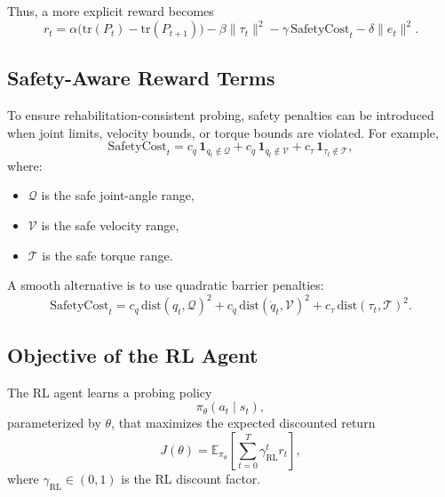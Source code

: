 \documentclass[11pt]{article}
\begin{document}
Thus, a more explicit reward becomes
\begin{equation}
r_t =
\alpha \bigl(\mathrm{tr}(P_t)-\mathrm{tr}(P_{t+1})\bigr)
-\beta \|\tau_t\|^2
-\gamma\,\mathrm{SafetyCost}_t
-\delta \|e_t\|^2.
\label{eq:rl_reward_trace}
\end{equation}

\subsection{Safety-Aware Reward Terms}

To ensure rehabilitation-consistent probing, safety penalties can be introduced when joint limits, velocity bounds, or torque bounds are violated. For example,
\begin{equation}
\mathrm{SafetyCost}_t =
c_q \,\mathbf{1}_{q_t \notin \mathcal{Q}}
+ c_{\dot{q}} \,\mathbf{1}_{\dot{q}_t \notin \mathcal{V}}
+ c_{\tau} \,\mathbf{1}_{\tau_t \notin \mathcal{T}},
\end{equation}
where:
\begin{itemize}
    \item \(\mathcal{Q}\) is the safe joint-angle range,
    \item \(\mathcal{V}\) is the safe velocity range,
    \item \(\mathcal{T}\) is the safe torque range.
\end{itemize}

A smooth alternative is to use quadratic barrier penalties:
\begin{equation}
\mathrm{SafetyCost}_t =
c_q \,\mathrm{dist}(q_t,\mathcal{Q})^2
+ c_{\dot{q}} \,\mathrm{dist}(\dot{q}_t,\mathcal{V})^2
+ c_{\tau} \,\mathrm{dist}(\tau_t,\mathcal{T})^2.
\end{equation}

\subsection{Objective of the RL Agent}

The RL agent learns a probing policy
\begin{equation}
\pi_\theta(a_t \mid s_t),
\end{equation}
parameterized by \(\theta\), that maximizes the expected discounted return
\begin{equation}
J(\theta)=\mathbb{E}_{\pi_\theta}\left[\sum_{t=0}^{T}\gamma_{\mathrm{RL}}^t r_t\right],
\end{equation}
where \(\gamma_{\mathrm{RL}}\in(0,1)\) is the RL discount factor.
\end{document}
